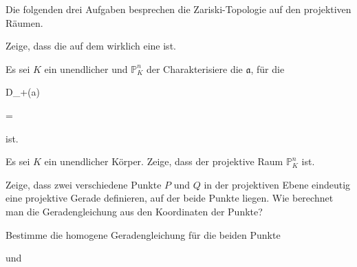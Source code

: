 {} {}


Die folgenden drei Aufgaben besprechen die Zariski-Topologie auf den projektiven Räumen.



{}

{


Zeige, dass die
auf dem
wirklich eine
ist.


}

{} {}



{}

{


Es sei $K$ ein unendlicher
und ${\mathbb P}^{ n }_{ K}$ der
Charakterisiere die
${\mathfrak a}$, für die


\mavergleichskette

{\vergleichskette

{ D_+({\mathfrak a})
}

{ = }{ \emptyset
}

{  }{
}

{    }{
}

{   }{
}

}
{}{}{}
ist.


}

{} {}



{}

{


Es sei $K$ ein unendlicher Körper. Zeige, dass der projektive Raum ${\mathbb P}^{ n }_{ K}$
ist.


}

{} {}





{}

{


Zeige, dass zwei verschiedene Punkte $P$ und $Q$ in der projektiven Ebene eindeutig eine projektive Gerade definieren, auf der beide Punkte liegen. Wie berechnet man die Geradengleichung aus den Koordinaten der Punkte?


}

{Bestimme die homogene Geradengleichung für die beiden Punkte

 und

} {}


